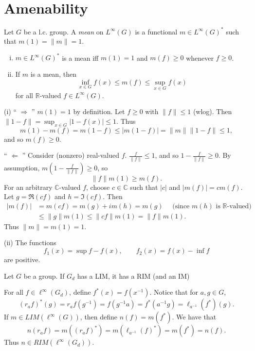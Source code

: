 \documentclass[12pt]{report}
\begin{document}
\section{Amenability}
\begin{defn}
Let $G$ be a l.c. group.  A {\it mean} on $L^\infty(G)$ is a functional $m\in L^\infty(G)^*$
such that $m(1) = \|m\| = 1$.
\end{defn}

\begin{theorem}
\begin{enumerate}[(i)]
\item $m\in L^\infty(G)^*$ is a mean iff $m(1) = 1$ and $m(f) \geq 0$ whenever $f\geq 0$.
\item If $m$ is a mean, then
\[
\inf_{x\in G}f(x) \leq m(f) \leq \sup_{x\in G}f(x)
\]
for all $\mathbb{R}$-valued $f\in L^\infty(G)$.
\end{enumerate}
\end{theorem}
\proof
(i) `` $\Rightarrow$ ''  $m(1)=1$ by definition.  Let $f\geq 0$ with $\|f\| \leq 1$ (wlog).
Then $\|1-f\| = \sup_{x\in G}|1-f(x)| \leq 1$.  Thus
\[
m(1) - m(f) = m(1-f) \leq |m(1-f)| = \|m\|\|1-f\| \leq 1,
\]
and so $m(f) \geq 0$.

`` $\Leftarrow$ ''
Consider (nonzero) real-valued $f$.  $\frac{f}{\|f\|} \leq 1$, and so $1-\frac{f}{\|f\|} \geq 0$.
By assumption, $m\left(1-\frac{f}{\|f\|}\right) \geq 0$, so
\[
\|f\|m(1) \geq m(f).
\]
For an arbitrary $\mathbb{C}$-valued $f$, choose $c\in\mathbb{C}$ such that $|c|$ and
$|m(f)| = cm(f)$.  Let $g=\Re(cf)$ and $h=\Im(cf)$.  Then
\begin{align*}
|m(f)| &= m(cf) = m(g) + im(h) = m(g)\quad\text{ (since $m(h)$ is $\mathbb{R}$-valued)}\\
&\leq \|g\|m(1) \leq \|cf\|m(1) = \|f\|m(1).
\end{align*}
Thus $\|m\| = m(1) = 1$.

(ii)
The functions
\[
f_1(x) = \sup f - f(x),\qquad f_2(x) = f(x) - \inf f
\]
are positive.
\done
\begin{theorem}
Let $G$ be a group.  If $G_d$ has a LIM, it has a RIM (and an IM)
\end{theorem}
\proof
For all $f\in \ell^\infty(G_d)$, define $f^*(x) = f(x^{-1})$.  Notice that for $a,g\in G$,
\[
(r_a f)^*(g) = r_a f(g^{-1}) = f(g^{-1}a) = f^*(a^{-1}g) = \ell_{a^{-1}}(f^*)(g).
\]
If $m\in LIM(\ell^\infty(G))$, then define $n(f) = m(f^*)$.
We have that
\[
n(r_a f) = m((r_a f)^*) = m(\ell_{a^{-1}}(f)^*) = m(f^*) = n(f).
\]
Thus $n\in RIM(\ell^\infty(G_d))$.
\done
\end{document}
